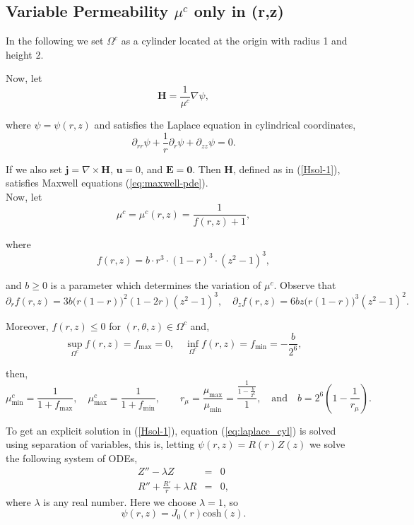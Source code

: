 \documentclass[11pt]{amsart}
\begin{document}
\subsection{ Variable  Permeability ${\mu}^c$ only in (r,z)}

In the following we set $\Omega^c$ as a cylinder located at the origin with radius 1 and height 2.

\noindent Now, let
\begin{equation}
 \label{Hsol-1}
\mathbf{H}=\frac{1}{{\mu}^c} \nabla \psi,
\end{equation}

\noindent where $\psi=\psi(r,z)$ and satisfies the Laplace equation in cylindrical coordinates,
\begin{equation}
\label{eq:laplace_cyl}
\partial _{rr}\psi + \frac{1}{r} \partial _r \psi + \partial_{zz} \psi = 0.
\end{equation}

\noindent If we also set  $\mathbf{j}= \nabla \times \mathbf{H}$, $\mathbf{u}=0$, and $\mathbf{E}=\mathbf{0}$. Then $\mathbf H$, defined as in (\ref{Hsol-1}),
satisfies Maxwell equations (\ref{eq:maxwell-pde}).\\

\noindent Now, let
\begin{equation}
{\mu^c}={\mu^c(r,z)}=\frac{1}{f(r,z)+1 },
\end{equation}

\noindent where $$f(r,z)= b \cdot r^3 \cdot (1-r)^3 \cdot (z^2-1)^3,$$
 
\noindent and  $b\geq 0 $ is a  parameter which determines the variation of ${\mu}^c$.
\noindent Observe that 
$$
\partial _r f(r,z) = 3b\big ( r(1-r)\big )^2(1-2r)(z^2-1)^3,
\quad
\partial _z f(r,z) = 6bz\big  (r(1-r))^3 (z^2-1)^2.
$$



Moreover,  $f (r,z) \leq 0$ for $(r,\theta,z) \in \Omega^c$ and,
$$
\sup _{\Omega^c} f(r,z)=f_{\text{max}}=0 , 
\quad 
\inf _{\Omega^c} f(r,z)=f_{\text{min}}= -\frac{b}{2^6}, 
$$

\noindent then,
$$
\mu_{\text{min}} ^c = \frac{1}{1 + f_{\text{max}}},\quad   \mu_{\text{max}} ^c =\frac{1}{1 + f_{\text{min}}},
 \quad  \quad r_{\mu}=\frac{\mu _{\text{max}}}{\mu _{\text{min}}}=\frac{\frac{1}{1-\frac{b}{2^6}}}{1}, \quad \text{and} \quad b= 2^6\left (1- \frac{1}{r_{\mu}}\right).
$$



\noindent To get an explicit solution in (\ref{Hsol-1}),  equation (\ref{eq:laplace_cyl}) is solved using separation of variables, this is, letting
$\psi(r,z)=R(r)Z(z)$ we solve the following system of ODEs,
\begin{eqnarray*}
Z''-\lambda Z & = & 0 \\
R''+\frac{R'}{r}+\lambda  R & = & 0,
\end{eqnarray*}
where $\lambda$ is any real number. Here we choose $\lambda=1$, so
\begin{equation}
\label{psi-sol1}
\psi(r,z)=J_0(r)\text{cosh}(z).
\end{equation}
\end{document}
